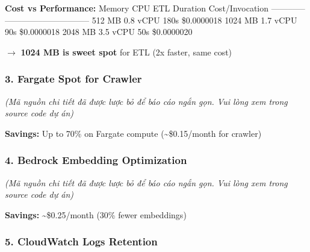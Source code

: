 \begin{Shaded}
\begin{Highlighting}[]

\end{Highlighting}
\end{Shaded}

\textbf{Cost vs Performance:} \textbar{} Memory \textbar{} CPU
\textbar{} ETL Duration \textbar{} Cost/Invocation \textbar{}
\textbar--------\textbar-----\textbar--------------\textbar-----------------\textbar{}
\textbar{} 512 MB \textbar{} 0.8 vCPU \textbar{} 180s \textbar{}
\$0.0000018 \textbar{} \textbar{} 1024 MB \textbar{} 1.7 vCPU \textbar{}
90s \textbar{} \$0.0000018 \textbar{} \textbar{} 2048 MB \textbar{} 3.5
vCPU \textbar{} 50s \textbar{} \$0.0000020 \textbar{}

\(\rightarrow\) \textbf{1024 MB is sweet spot} for ETL (2x faster, same
cost)

\hypertarget{fargate-spot-for-crawler}{%
\subsubsection{3. Fargate Spot for
Crawler}}

\emph{(Mã nguồn chi tiết đã được lược bỏ để báo cáo ngắn gọn. Vui lòng
xem trong source code dự án)}

\textbf{Savings:} Up to 70\% on Fargate compute
(\textasciitilde\$0.15/month for crawler)

\hypertarget{bedrock-embedding-optimization}{%
\subsubsection{4. Bedrock Embedding
Optimization}}

\emph{(Mã nguồn chi tiết đã được lược bỏ để báo cáo ngắn gọn. Vui lòng
xem trong source code dự án)}

\textbf{Savings:} \textasciitilde\$0.25/month (30\% fewer embeddings)

\hypertarget{cloudwatch-logs-retention}{%
\subsubsection{5. CloudWatch Logs
Retention}}

